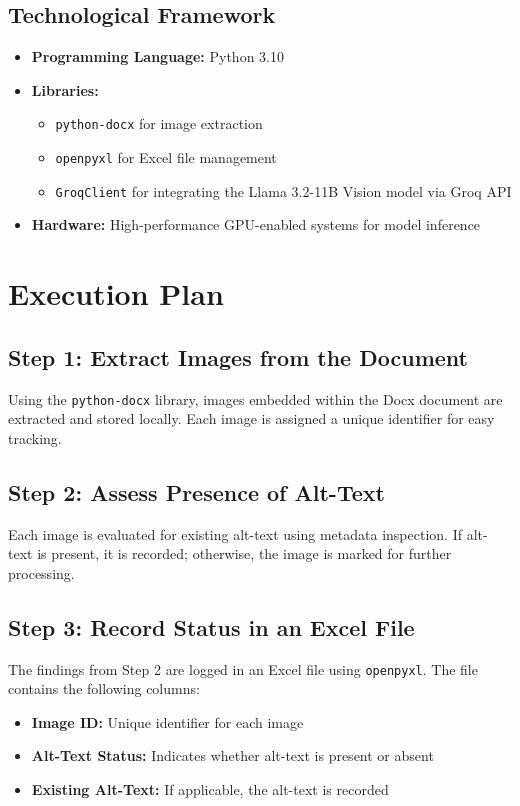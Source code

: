 \documentclass[12pt]{article}
\begin{document}
\subsection{Technological Framework}
\begin{itemize}
    \item \textbf{Programming Language:} Python 3.10
    \item \textbf{Libraries:} 
    \begin{itemize}
        \item \texttt{python-docx} for image extraction
        \item \texttt{openpyxl} for Excel file management
        \item \texttt{GroqClient} for integrating the Llama 3.2-11B Vision model via Groq API
    \end{itemize}
    \item \textbf{Hardware:} High-performance GPU-enabled systems for model inference
\end{itemize}

\section{Execution Plan}
\subsection*{Step 1: Extract Images from the Document}
Using the \texttt{python-docx} library, images embedded within the Docx document are extracted and stored locally. Each image is assigned a unique identifier for easy tracking.

\subsection*{Step 2: Assess Presence of Alt-Text}
Each image is evaluated for existing alt-text using metadata inspection. If alt-text is present, it is recorded; otherwise, the image is marked for further processing.

\subsection*{Step 3: Record Status in an Excel File}
The findings from Step 2 are logged in an Excel file using \texttt{openpyxl}. The file contains the following columns:
\begin{itemize}
    \item \textbf{Image ID:} Unique identifier for each image
    \item \textbf{Alt-Text Status:} Indicates whether alt-text is present or absent
    \item \textbf{Existing Alt-Text:} If applicable, the alt-text is recorded
\end{itemize}
\end{document}

